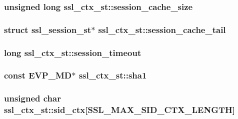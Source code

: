 \subsubsection[{\texorpdfstring{session\+\_\+cache\+\_\+size}{session_cache_size}}]{\setlength{\rightskip}{0pt plus 5cm}unsigned long ssl\+\_\+ctx\+\_\+st\+::session\+\_\+cache\+\_\+size}\hypertarget{structssl__ctx__st_af715c6f8caa8c192423ad5abfa211e6e}{}\label{structssl__ctx__st_af715c6f8caa8c192423ad5abfa211e6e}
\subsubsection[{\texorpdfstring{session\+\_\+cache\+\_\+tail}{session_cache_tail}}]{\setlength{\rightskip}{0pt plus 5cm}struct {\bf ssl\+\_\+session\+\_\+st}$\ast$ ssl\+\_\+ctx\+\_\+st\+::session\+\_\+cache\+\_\+tail}\hypertarget{structssl__ctx__st_a1524f4319d24d011a575b8e9a70a0065}{}\label{structssl__ctx__st_a1524f4319d24d011a575b8e9a70a0065}
\subsubsection[{\texorpdfstring{session\+\_\+timeout}{session_timeout}}]{\setlength{\rightskip}{0pt plus 5cm}long ssl\+\_\+ctx\+\_\+st\+::session\+\_\+timeout}\hypertarget{structssl__ctx__st_a7b165f0e9fbde0499dedb660cdf0d756}{}\label{structssl__ctx__st_a7b165f0e9fbde0499dedb660cdf0d756}
\subsubsection[{\texorpdfstring{sha1}{sha1}}]{\setlength{\rightskip}{0pt plus 5cm}const {\bf E\+V\+P\+\_\+\+MD}$\ast$ ssl\+\_\+ctx\+\_\+st\+::sha1}\hypertarget{structssl__ctx__st_ae6ea4c79f3be1d3c103b290e08009204}{}\label{structssl__ctx__st_ae6ea4c79f3be1d3c103b290e08009204}
\subsubsection[{\texorpdfstring{sid\+\_\+ctx}{sid_ctx}}]{\setlength{\rightskip}{0pt plus 5cm}unsigned char ssl\+\_\+ctx\+\_\+st\+::sid\+\_\+ctx\mbox{[}{\bf S\+S\+L\+\_\+\+M\+A\+X\+\_\+\+S\+I\+D\+\_\+\+C\+T\+X\+\_\+\+L\+E\+N\+G\+TH}\mbox{]}}\hypertarget{structssl__ctx__st_a92f94c2a4612e04ec3c075c76aae5553}{}\label{structssl__ctx__st_a92f94c2a4612e04ec3c075c76aae5553}
